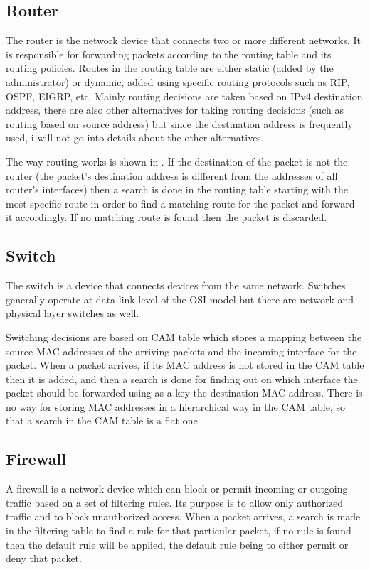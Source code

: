 \subsection{Router}
\label{sub-sec:router}
The router is the network device that connects two or more different networks. It is responsible for forwarding packets according to the routing table and its routing policies. Routes in the routing table are either static (added by the administrator) or dynamic, added using specific routing protocols such as RIP, OSPF, EIGRP, etc.
Mainly routing decisions are taken based on IPv4 destination address, there are also other alternatives for taking routing decisions (such as routing based on source address) but since the destination address is frequently used, i will not go into details about the other alternatives. 

The way routing works is shown in .
If the destination of the packet is not the router (the packet's destination address is different from the addresses of all router's interfaces) then a search is done in the routing table starting with the most specific route in order to find a matching route for the packet and forward it accordingly. If no matching route is found then the packet is discarded.
\subsection{Switch}
\label{sub-sec:switch}
The switch is a device that connects devices from the same network. Switches generally operate at data link level of the OSI model but there are network and physical layer switches as well. 

Switching decisions are based on CAM table which stores a mapping between the source MAC addresses of the arriving packets and the incoming interface for the packet. When a packet arrives, if its MAC address is not stored in the CAM table then it is added, and then a search is done for finding out on which interface the packet should be forwarded using as a key the destination MAC address. There is no way for storing MAC addresses in a hierarchical way in the CAM table, so that a search in the CAM table is a flat one.     
\subsection{Firewall}
\label{sub-sec:firewall}
A firewall is a network device which can block or permit incoming or outgoing traffic based on a set of filtering rules. Its purpose is to allow only authorized traffic and to block unauthorized access. When a packet arrives, a search is made in the filtering table to find a rule for that particular packet, if no rule is found then the default rule will be applied, the default rule being to either permit or deny that packet. 

